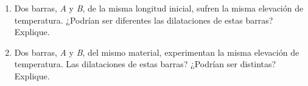 \begin{enumerate}
	\item Dos barras, \textit{A} y \textit{B}, de la misma longitud inicial, sufren la misma elevación de temperatura. ¿Podrían ser diferentes las dilataciones de estas barras? Explique.
	\item Dos barras, \textit{A} y \textit{B}, del mismo material, experimentan la misma elevación de temperatura. Las dilataciones de estas barras? ¿Podrían ser distintas? Explique.
\end{enumerate}